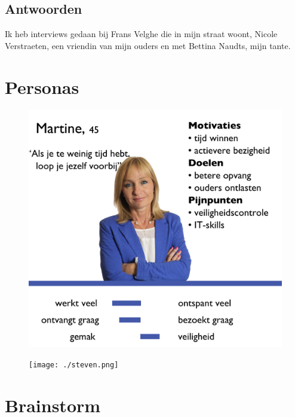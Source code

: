 \documentclass[a4paper,12pt]{article}
\begin{document}
\subsection{Antwoorden}
Ik heb interviews gedaan bij Frans Velghe die in mijn straat woont, Nicole Verstraeten, een vriendin van mijn ouders en met Bettina Naudts, mijn tante.





\section{Personas}

\begin{figure}[H]
  \centering
  \includegraphics[width=\textwidth,keepaspectratio]{./martine.png}
\end{figure}

\begin{figure}[H]
  \centering
  \texttt{[image: ./steven.png]}
\end{figure}

\section{Brainstorm}
\end{document}
